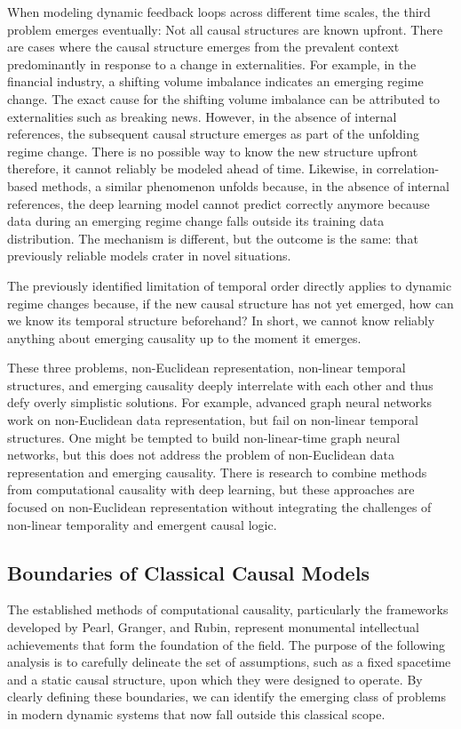 When modeling dynamic feedback loops across different time scales, the third problem emerges eventually: Not all causal structures are known upfront. There are cases where the causal structure emerges from the prevalent context predominantly in response to a change in externalities. For example, in the financial industry, a shifting volume imbalance indicates an emerging regime change. The exact cause for the shifting volume imbalance can be attributed to externalities such as breaking news. However, in the absence of internal references, the subsequent  causal structure emerges as part of the unfolding regime change. There is no possible way to know the new structure upfront therefore, it cannot reliably be modeled ahead of time. Likewise, in correlation-based methods, a similar phenomenon unfolds because, in the absence of internal references, the deep learning model cannot predict correctly anymore because data during an emerging regime change falls outside its training data distribution. The mechanism is different, but the outcome is the same: that previously reliable models crater in novel situations.

The previously identified limitation of temporal order directly applies to dynamic regime changes because, if the new causal structure has not yet emerged, how can we know its temporal structure beforehand? In short, we cannot know reliably anything about emerging causality up to the moment it emerges.

These three problems, non-Euclidean representation, non-linear temporal structures, and emerging causality deeply interrelate with each other and thus defy overly simplistic solutions. For example, advanced graph neural networks work on non-Euclidean data representation, but fail on non-linear temporal structures. One might be tempted to build non-linear-time graph neural networks, but this does not address the problem of non-Euclidean data representation and emerging causality. There is research to combine methods from computational causality with deep learning, but these approaches are focused on non-Euclidean representation without integrating the challenges of non-linear temporality and emergent causal logic.

\subsection{Boundaries of Classical Causal Models}

The established methods of computational causality, particularly the frameworks developed by Pearl, Granger, and Rubin, represent monumental intellectual achievements that form the foundation of the field. The purpose of the following analysis is to carefully delineate the set of assumptions, such as a fixed spacetime and a static causal structure, upon which they were designed to operate. By clearly defining these boundaries, we can identify the emerging class of problems in modern dynamic systems that now fall outside this classical scope. 

